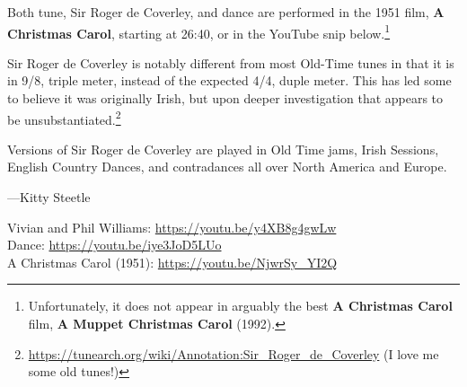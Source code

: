\documentclass[11pt]{article}
\begin{document}
{\begin{minipage}{7.0in}
    Both tune, Sir Roger de Coverley, and dance are performed in the
    1951 film, \textbf{A Christmas Carol}, starting at 26:40, or in
    the YouTube snip below.\footnote{Unfortunately, it does not appear
      in arguably the best \textbf{A Christmas Carol} film, \textbf{A
        Muppet Christmas Carol} (1992).}
    
    Sir Roger de Coverley is notably different from most Old-Time
    tunes in that it is in 9/8, triple meter, instead of the expected
    4/4, duple meter. This has led some to believe it was originally
    Irish, but upon deeper investigation that appears to be
    unsubstantiated.\footnote{\url{https://tunearch.org/wiki/Annotation:Sir\_Roger\_de\_Coverley}
      (I love me some old tunes!)}
    
    Versions of Sir Roger de Coverley are played in Old Time jams, Irish Sessions, English Country Dances,
    and contradances all over North America and Europe.
    
    ---Kitty Steetle

    \bigskip\noindent
    Vivian and Phil Williams: \url{https://youtu.be/y4XB8g4gwLw} \\
    Dance: \url{https://youtu.be/iye3JoD5LUo}  \\
    A Christmas Carol (1951): \url{https://youtu.be/NjwrSy\_YI2Q}
    
    
  \end{minipage}
}
\end{document}
